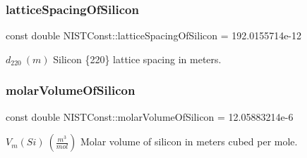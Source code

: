 \subsubsection{\texorpdfstring{lattice\+Spacing\+Of\+Silicon}{latticeSpacingOfSilicon}}
{\footnotesize\ttfamily const double N\+I\+S\+T\+Const\+::lattice\+Spacing\+Of\+Silicon = 192.\+0155714e-\/12}

$d_{220} \ (m)$ Silicon \{220\} lattice spacing in meters. \mbox{\label{group___n_i_s_t_const-_silicon_gaf084f6d4668f778d204cd782269f082c}} 
\subsubsection{\texorpdfstring{molar\+Volume\+Of\+Silicon}{molarVolumeOfSilicon}}
{\footnotesize\ttfamily const double N\+I\+S\+T\+Const\+::molar\+Volume\+Of\+Silicon = 12.\+05883214e-\/6}

$V_m(Si) \ (\frac{m^3}{mol})$ Molar volume of silicon in meters cubed per mole. 